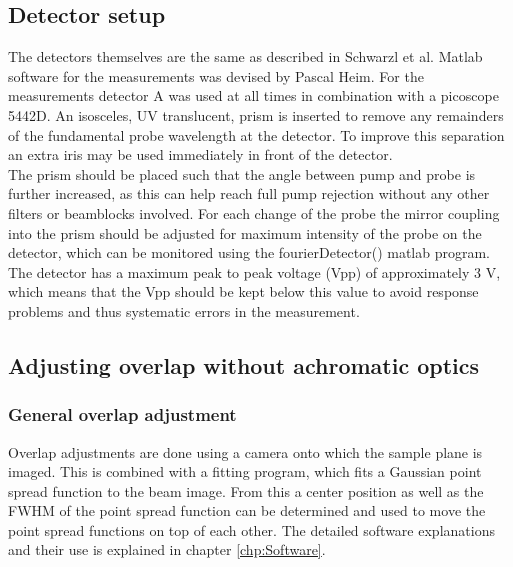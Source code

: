 \documentclass[twoside,openright]{scrreprt}
\begin{document}
\subsection{Detector setup}
The detectors themselves are the same as described in Schwarzl et al.\cite{Schwarzl2022} Matlab software for the measurements was devised by Pascal Heim. For the measurements detector A was used at all times in combination with a picoscope 5442D. An isosceles, UV translucent, prism is inserted to remove any remainders of the fundamental probe wavelength at the detector. To improve this separation an extra iris may be used immediately in front of the detector.\\
The prism should be placed such that the angle between pump and probe is further increased, as this can help reach full pump rejection without any other filters or beamblocks involved. For each change of the probe the mirror coupling into the prism should be adjusted for maximum intensity of the probe on the detector, which can be monitored using the fourierDetector() matlab program.\\
The detector has a maximum peak to peak voltage (Vpp) of approximately 3 V, which means that the Vpp should be kept below this value to avoid response problems and thus systematic errors in the measurement.
\subsection{Adjusting overlap without achromatic optics}

\subsubsection{General overlap adjustment}
Overlap adjustments are done using a camera onto which the sample plane is imaged. This is combined with a fitting program, which fits a Gaussian point spread function to the beam image. From this a center position as well as the FWHM of the point spread function can be determined and used to move the point spread functions on top of each other. The detailed software explanations and their use is explained in chapter \ref{chp:Software}.\\
\end{document}
